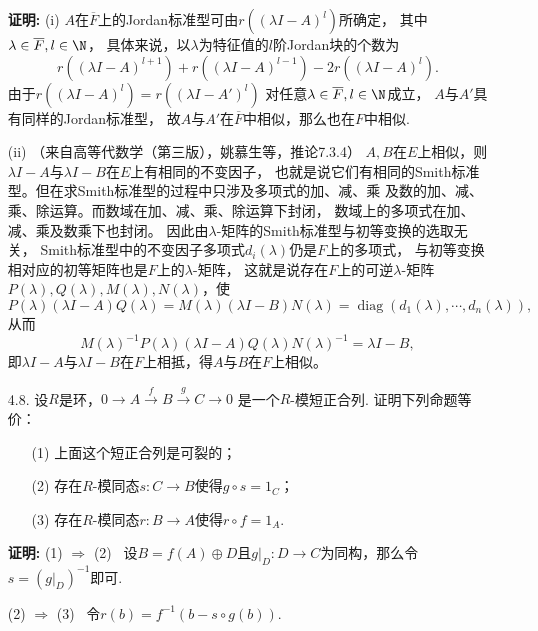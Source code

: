 \begin{enumerate}
    (ii)设$E/F$是域扩张，$A,B\in M_n(F)$，若$A,B$在$M_n(E)$中相似，
    问$A,B$在$M_n(F)$中是否一定相似？说明理由。

    \item[\textbf{证明:}]
    (i) $A$在$\overline{F}$上的Jordan标准型可由$r((\lambda I-A)^l)$所确定，
    其中$\lambda\in\overline{F},l\in\N$，
    具体来说，以$\lambda$为特征值的$l$阶Jordan块的个数为
    $$r((\lambda I-A)^{l+1})+r((\lambda I-A)^{l-1})-2r((\lambda I-A)^l).$$
    由于$r((\lambda I-A)^l)=r((\lambda I-A')^l)$
    对任意$\lambda\in\overline{F},l\in\N$成立，
    $A$与$A'$具有同样的Jordan标准型，
    故$A$与$A'$在$\overline{F}$中相似，那么也在$F$中相似.

    (ii) （来自高等代数学（第三版），姚慕生等，推论7.3.4）
    $A,B$在$E$上相似，则$\lambda I-A$与$\lambda I-B$在$E$上有相同的不变因子，
    也就是说它们有相同的Smith标准型。但在求Smith标准型的过程中只涉及多项式的加、减、乘
    及数的加、减、乘、除运算。而数域在加、减、乘、除运算下封闭，
    数域上的多项式在加、减、乘及数乘下也封闭。
    因此由$\lambda$-矩阵的Smith标准型与初等变换的选取无关，
    Smith标准型中的不变因子多项式$d_i(\lambda)$仍是$F$上的多项式，
    与初等变换相对应的初等矩阵也是$F$上的$\lambda$-矩阵，
    这就是说存在$F$上的可逆$\lambda$-矩阵
    $P(\lambda),Q(\lambda),M(\lambda),N(\lambda)$，使
    $$P(\lambda)(\lambda I-A)Q(\lambda)=M(\lambda)(\lambda I-B)N(\lambda)
    =\operatorname{diag}(d_1(\lambda),\cdots,d_n(\lambda)),$$
    从而$$M(\lambda)^{-1}P(\lambda)(\lambda I-A)Q(\lambda)N(\lambda)^{-1}=\lambda I-B,$$
    即$\lambda I-A$与$\lambda I-B$在$F$上相抵，得$A$与$B$在$F$上相似。
    
    \item[4.8.]
    设$R$是环，$0\rightarrow A\stackrel{f}{\rightarrow}B
    \stackrel{g}{\rightarrow}C\rightarrow 0$
    是一个$R$-模短正合列. 证明下列命题等价：
    \begin{itemize}
    \item[(1)] 上面这个短正合列是可裂的；
    \item[(2)] 存在$R$-模同态$s:C\rightarrow B$使得$g\circ s=1_C$；
    \item[(3)] 存在$R$-模同态$r:B\rightarrow A$使得$r\circ f=1_A$.
    \end{itemize}
        \item[\textbf{证明:}]
    (1) $\Rightarrow$ (2)
    \ 设$B=f(A)\oplus D$且$g|_D:D\rightarrow C$为同构，那么令$s=(g|_D)^{-1}$即可.

    (2) $\Rightarrow$ (3)
    \ 令$r(b)=f^{-1}(b-s\circ g(b))$.
     

\end{enumerate}
